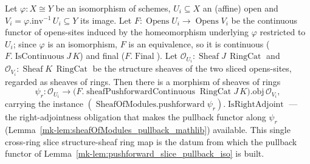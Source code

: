 \begin{lemma}
  \label{mk-lem:slice_structureSheaf_hom}

  Let \(\varphi : X \cong Y\) be an isomorphism of schemes, \(U_i \subseteq X\) an (affine) open and
  \(V_i = \varphi.\mathrm{inv}^{-1}\,U_i \subseteq Y\) its image. Let \(F : \operatorname{Opens} U_i \to
  \operatorname{Opens} V_i\) be the continuous functor of opens-sites induced by the homeomorphism
  underlying \(\varphi\) restricted to \(U_i\); since \(\varphi\) is an isomorphism, \(F\) is an
  equivalence, so it is continuous (\(F.\operatorname{IsContinuous} J\,K\)) and final
  (\(F.\operatorname{Final}\)). Let \(\mathcal{O}_{U_i} : \operatorname{Sheaf} J\,\operatorname{RingCat}\)
  and \(\mathcal{O}_{V_i} : \operatorname{Sheaf} K\,\operatorname{RingCat}\) be the structure sheaves of
  the two sliced opens-sites, regarded as sheaves of rings. Then there is a morphism of sheaves of rings
  \[
    \psi_r : \mathcal{O}_{U_i} \longrightarrow
      \bigl(F.\operatorname{sheafPushforwardContinuous} \operatorname{RingCat} J\,K\bigr).\mathrm{obj}\,
      \mathcal{O}_{V_i},
  \]
  carrying the instance \((\operatorname{SheafOfModules.pushforward}\psi_r).\operatorname{IsRightAdjoint}\)
  — the right-adjointness obligation that makes the pullback functor along \(\psi_r\)
  (Lemma~\ref{mk-lem:sheafOfModules_pullback_mathlib}) available. This single cross-ring slice
  structure-sheaf ring map is the datum from which the pullback functor of
  Lemma~\ref{mk-lem:pushforward_slice_pullback_iso} is built.
\end{lemma}
